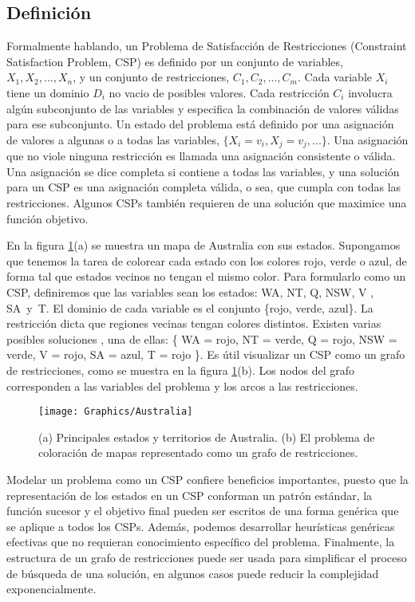 \subsection{Definición}

Formalmente hablando, un Problema de Satisfacción de Restricciones (Constraint Satisfaction Problem, CSP) es definido por un conjunto de variables, $X_{1},X_{2},...,X_{n}$, y un conjunto de restricciones, $C_{1},C_{2},...,C_{m}$. Cada variable $X_{i}$ tiene un dominio $D_{i}$ no vacio de posibles valores. Cada restricción $C_{i}$ involucra algún subconjunto de las variables y especifica la combinación de valores válidas para ese subconjunto. Un estado del problema está definido por una asignación de valores a algunas o a todas las variables, $\{X_{i}=v_{i}, X_{j}=v_{j}, ...\}$. Una asignación que no viole ninguna restricción es llamada una asignación consistente o válida. Una asignación se dice completa si contiene a todas las variables, y una solución para un CSP es una asignación completa válida, o sea, que cumpla con todas las restricciones. Algunos CSPs tambi\'en requieren de una solución que maximice una función objetivo.

En la figura \ref{Australia}(a) se muestra un mapa de Australia con sus estados. Supongamos que tenemos la tarea de colorear cada estado con los colores rojo, verde o azul, de forma tal que estados vecinos no tengan el mismo color. Para formularlo como un CSP, definiremos que las variables sean los estados: WA, NT, Q, NSW, V , SA\ y\ T. El dominio de cada variable  es el conjunto \{rojo, verde, azul\}. La restricción dicta que regiones vecinas tengan colores distintos. Existen varias posibles soluciones , una de ellas: \{ WA = rojo, NT = verde, Q = rojo, NSW = verde, V = rojo, SA = azul, T = rojo \}. Es útil visualizar un CSP como un grafo de restricciones, como se muestra en la figura \ref{Australia}(b). Los nodos del grafo corresponden a las variables del problema y los arcos a las restricciones.

\begin{figure}
	\begin{center}
		\texttt{[image: Graphics/Australia]}
		\caption{(a) Principales estados y territorios de Australia. (b) El problema de coloración de mapas representado como un grafo de restricciones.}
		\label{Australia}
	\end{center}	
\end{figure}

Modelar un problema como un CSP confiere beneficios importantes, puesto que la representación de los estados en un CSP
conforman un patrón estándar, la función sucesor y el objetivo final pueden ser escritos de una forma gen\'erica que se aplique a todos los CSPs. Adem\'as, podemos desarrollar heur\'isticas gen\'ericas efectivas que no requieran conocimiento espec\'ifico del problema. Finalmente, la estructura de un grafo de restricciones puede ser usada para simplificar el proceso de búsqueda de una solución, en algunos casos puede reducir la complejidad exponencialmente.

